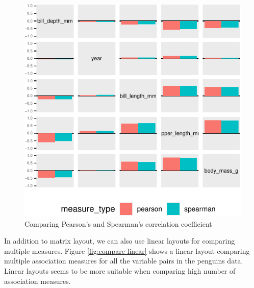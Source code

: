 \begin{Schunk}
\begin{figure}

{\centering \includegraphics{rj_paper_files/figure-latex/compare-matrix-1} 

}

\caption[Comparing Pearson's and Spearman's correlation coefficient]{Comparing Pearson's and Spearman's correlation coefficient}\label{fig:compare-matrix}
\end{figure}
\end{Schunk}

In addition to matrix layout, we can also use linear layouts for
comparing multiple measures. Figure \ref{fig:compare-linear} shows a
linear layout comparing multiple association measures for all the
variable pairs in the penguins data. Linear layouts seems to be more
suitable when comparing high number of association measures.

